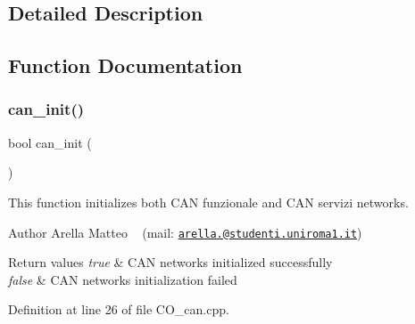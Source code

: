 \subsection{Detailed Description}


\subsection{Function Documentation}
\mbox{\label{group___c_a_n__module__group_ga36b6b5924eb84ef2e4c2bd548b28436f}} 
\subsubsection{\texorpdfstring{can\+\_\+init()}{can\_init()}}
{\footnotesize\ttfamily bool can\+\_\+init (\begin{DoxyParamCaption}{ }\end{DoxyParamCaption})}



This function initializes both C\+AN funzionale and C\+AN servizi networks. 

\begin{DoxyAuthor}{Author}
Arella Matteo ~\newline
 (mail\+: \href{mailto:arella.1646983@studenti.uniroma1.it}{\tt arella.@studenti.\+uniroma1.\+it}) 
\end{DoxyAuthor}

\begin{DoxyRetVals}{Return values}
{\em true} & C\+AN networks initialized successfully \\
\hline
{\em false} & C\+AN networks initialization failed \\
\hline
\end{DoxyRetVals}


Definition at line 26 of file C\+O\+\_\+can.\+cpp.

